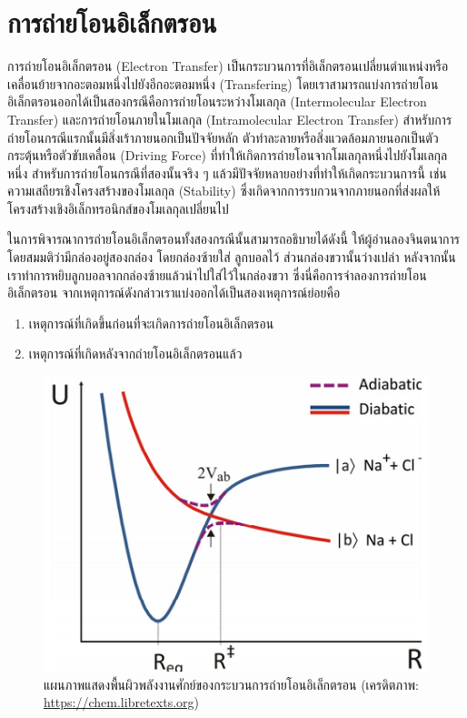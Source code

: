 \section{การถ่ายโอนอิเล็กตรอน}
\label{sec:et}

การถ่ายโอนอิเล็กตรอน (Electron Transfer) เป็นกระบวนการที่อิเล็กตรอนเปลี่ยนตำแหน่งหรือเคลื่อนย้ายจากอะตอมหนึ่งไปยังอีกอะตอมหนึ่ง
(Transfering) โดยเราสามารถแบ่งการถ่ายโอนอิเล็กตรอนออกได้เป็นสองกรณีคือการถ่ายโอนระหว่างโมเลกุล (Intermolecular Electron
Transfer) และการถ่ายโอนภายในโมเลกุล (Intramolecular Electron Transfer) สำหรับการถ่ายโอนกรณีแรกนั้นมีสิ่งเร้าภายนอกเป็นปัจจัยหลัก
ตัวทำละลายหรือสิ่งแวดล้อมภายนอกเป็นตัวกระตุ้นหรือตัวขับเคลื่อน (Driving Force) ที่ทำให้เกิดการถ่ายโอนจากโมเลกุลหนึ่งไปยังโมเลกุลหนึ่ง
สำหรับการถ่ายโอนกรณีที่สองนั้นจริง ๆ แล้วมีปัจจัยหลายอย่างที่ทำให้เกิดกระบวนการนี้ เช่น ความเสถียรเชิงโครงสร้างของโมเลกุล (Stability)
ซึ่งเกิดจากการรบกวนจากภายนอกที่ส่งผลให้โครงสร้างเชิงอิเล็กทรอนิกส์ของโมเลกุลเปลี่ยนไป

ในการพิจารณาการถ่ายโอนอิเล็กตรอนทั้งสองกรณีนั้นสามารถอธิบายได้ดังนี้ ให้ผู้อ่านลองจินตนาการโดยสมมติว่ามีกล่องอยู่สองกล่อง โดยกล่องซ้ายใส่%
ลูกบอลไว้ ส่วนกล่องขวานั้นว่างเปล่า หลังจากนั้นเราทำการหยิบลูกบอลจากกล่องซ้ายแล้วนำไปใส่ไว้ในกล่องขวา ซึ่งนี่คือการจำลองการถ่ายโอนอิเล็กตรอน
จากเหตุการณ์ดังกล่าวเราแบ่งออกได้เป็นสองเหตุการณ์ย่อยคือ

\begin{enumerate}
    \item เหตุการณ์ที่เกิดขึ้นก่อนที่จะเกิดการถ่ายโอนอิเล็กตรอน

    \item เหตุการณ์ที่เกิดหลังจากถ่ายโอนอิเล็กตรอนแล้ว
\end{enumerate}

\begin{figure}[htbp]
    \centering
    \includegraphics[width=0.7\linewidth]{fig/et_diagram.png}
    \caption{แผนภาพแสดงพื้นผิวพลังงานศักย์ของกระบวนการถ่ายโอนอิเล็กตรอน (เครดิตภาพ: \url{https://chem.libretexts.org})}
    \label{fig:et_diagram}
\end{figure}

